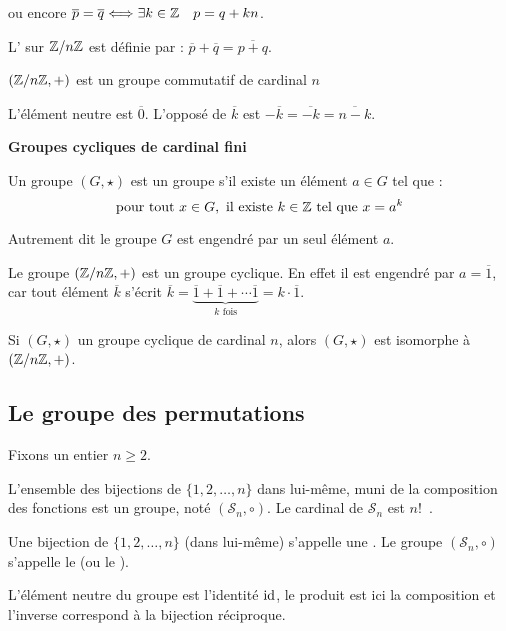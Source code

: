 \documentclass[10pt,class=article,crop=false]{standalone}
\begin{document}
\begin{multicols}{2}
ou encore
$\overline p = \overline q \Longleftrightarrow \exists k \in \mathbb{Z} \quad p = q + kn$.


L' sur $\mathbb{Z}/n\mathbb{Z}$ est définie par : $\overline p + \overline q = \overline{p+q}$.



\begin{proposition}
$(\mathbb{Z}/n\mathbb{Z},+)$ est un groupe commutatif de cardinal $n$
\end{proposition}

L'élément neutre est $\overline{0}$.
L'opposé de $\overline k$ est $-\overline{k}=\overline{-k}=\overline{n-k}$.


\textbf{Groupes cycliques de cardinal fini}


Un groupe $(G,\star)$ est un groupe  s'il existe un élément $a \in G$ tel que :
$$\text{pour tout } x \in G, \text{ il existe } k \in \mathbb{Z} \text{ tel que } x = a^k$$


Autrement dit le groupe $G$ est engendré par un seul élément $a$.

Le groupe $(\mathbb{Z}/n\mathbb{Z},+)$ est un groupe cyclique. En effet il est engendré par $a=\overline 1$,
car tout élément $\overline k$ s'écrit $\overline k =
\underbrace{\overline 1 + \overline 1 + \cdots \overline 1}_{k \text{ fois}} = k\cdot \overline 1$.

\begin{theoreme}
	\label{prop:cyclique}
	Si $(G,\star)$ un groupe cyclique de cardinal $n$, alors
	$(G,\star)$ est isomorphe à $(\mathbb{Z}/n\mathbb{Z},+)$.
\end{theoreme}



\subsection{Le groupe des permutations}

Fixons un entier $n\ge 2$.
\begin{proposition}
	L'ensemble des bijections de $\{1,2,\ldots,n\}$ dans lui-même, muni de la composition
	des fonctions est un groupe, noté $(\mathcal{S}_n,\circ)$.
	Le cardinal de $\mathcal{S}_n$ est $n!$~.
\end{proposition}

Une bijection de $\{1,2,\ldots,n\}$ (dans lui-même) s'appelle une .
Le groupe $(\mathcal{S}_n,\circ)$ s'appelle le 
(ou le ).

L'élément neutre du groupe est l'identité $\operatorname{id}$, le produit est ici la composition et l'inverse correspond à la bijection réciproque.



\end{multicols}
\end{document}
